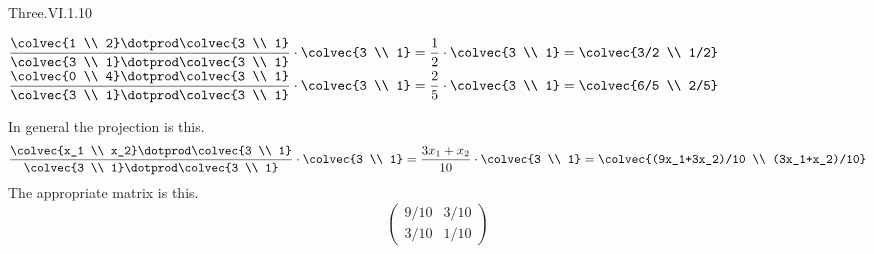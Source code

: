\begin{ans}{Three.VI.1.10}
      \begin{exparts*}
        \partsitem $\displaystyle
          \frac{\colvec{1 \\ 2}\dotprod\colvec{3 \\ 1}}{%
                 \colvec{3 \\ 1}\dotprod\colvec{3 \\ 1}}
          \cdot \colvec{3 \\ 1}
          =\frac{1}{2}\cdot\colvec{3 \\ 1}
          =\colvec{3/2 \\ 1/2}$
        \partsitem $\displaystyle
          \frac{\colvec{0 \\ 4}\dotprod\colvec{3 \\ 1}}{%
                 \colvec{3 \\ 1}\dotprod\colvec{3 \\ 1}}
          \cdot \colvec{3 \\ 1}
          =\frac{2}{5}\cdot\colvec{3 \\ 1}
          =\colvec{6/5 \\ 2/5}$
      \end{exparts*}
      \noindent In general the projection is this.
      \begin{equation*}
          \frac{\colvec{x_1 \\ x_2}\dotprod\colvec{3 \\ 1}}{%
                 \colvec{3 \\ 1}\dotprod\colvec{3 \\ 1}}
          \cdot \colvec{3 \\ 1}
          =\frac{3x_1+x_2}{10}\cdot\colvec{3 \\ 1}
          =\colvec{(9x_1+3x_2)/10 \\ (3x_1+x_2)/10}
      \end{equation*}
      The appropriate matrix is this.
      \begin{equation*}
        \begin{pmatrix}
          9/10  &3/10  \\
          3/10  &1/10
        \end{pmatrix}
      \end{equation*}
     
\end{ans}
